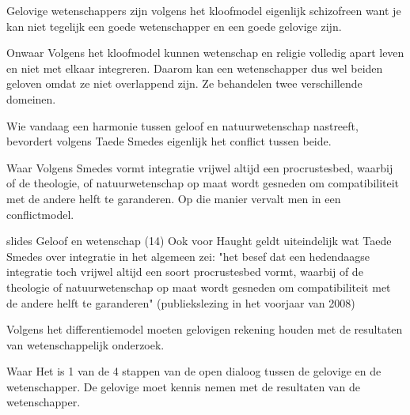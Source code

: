 \documentclass[main.tex]{subfiles}
\begin{document}
\begin{examenvraag}
    \begin{stelling}
        Gelovige wetenschappers zijn volgens het kloofmodel eigenlijk schizofreen want je kan niet tegelijk een goede wetenschapper en een goede gelovige zijn.
    \end{stelling}

    \begin{stelling-antwoord}{Onwaar}
		Volgens het kloofmodel kunnen wetenschap en religie volledig apart leven en niet met elkaar
		integreren. Daarom kan een wetenschapper dus wel beiden geloven omdat ze niet overlappend zijn.
		Ze behandelen twee verschillende domeinen.
    \end{stelling-antwoord}
\end{examenvraag}


\begin{examenvraag}
    \begin{stelling}
        Wie vandaag een harmonie tussen geloof en natuurwetenschap nastreeft, bevordert volgens Taede Smedes eigenlijk het conflict tussen beide.
    \end{stelling}

    \begin{stelling-antwoord}{Waar}
    Volgens Smedes vormt integratie vrijwel altijd een procrustesbed, waarbij of de theologie, of natuurwetenschap op maat wordt gesneden om compatibiliteit met de andere helft te garanderen. Op die manier vervalt men in een conflictmodel.
    
     \begin{citaat}{slides Geloof en wetenschap (14)}
	     Ook voor Haught geldt uiteindelijk wat Taede Smedes over integratie in het algemeen zei: "het besef dat een hedendaagse integratie toch vrijwel altijd een soort procrustesbed vormt, waarbij of de theologie of natuurwetenschap op maat wordt gesneden om compatibiliteit met de andere helft te garanderen" (publiekslezing in het voorjaar van 2008)
   	\end{citaat}			
    
    \end{stelling-antwoord}
\end{examenvraag}


\begin{examenvraag}
    \begin{stelling}
        Volgens het differentiemodel moeten gelovigen rekening houden met de resultaten van wetenschappelijk onderzoek.
    \end{stelling}

    \begin{stelling-antwoord}{Waar}
		Het is 1 van de 4 stappen van de open dialoog tussen de gelovige en de wetenschapper. De gelovige moet kennis nemen met de resultaten van de wetenschapper.		
       
  	\end{stelling-antwoord}
\end{examenvraag}
\end{document}

